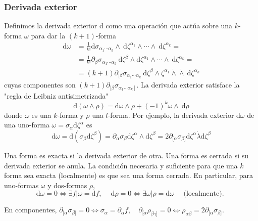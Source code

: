 \subsubsection{Derivada exterior}

Definimos la derivada exterior d como una operación que actúa sobre una $k$-forma $\omega$ para dar la $(k+1)$-forma
$$
\begin{aligned}
\mathrm{d} \omega & =\frac{1}{k!} \mathrm{d} \sigma_{\alpha_{1} \cdots \alpha_{k}} \wedge \mathrm{~d} \zeta^{\alpha_{1}} \wedge \cdots \wedge \mathrm{~d} \zeta^{\alpha_{k}}= \\
& =\frac{1}{k!} \partial_{\beta} \sigma_{\alpha_{1} \cdots \alpha_{k}} \mathrm{~d} \zeta^{\beta} \wedge \mathrm{d} \zeta^{\alpha_{1}} \wedge \cdots \wedge \mathrm{~d} \zeta^{\alpha_{k}}= \\
& =(k+1) \partial_{[\beta} \sigma_{\alpha_{1} \cdots \alpha_{k}} \mathrm{~d} \zeta^{\beta} \dot{\wedge} \zeta^{\alpha_{1}} \dot{\wedge} \dot{\wedge} \mathrm{~d} \zeta^{\alpha_{k}}
\end{aligned}
$$
cuyas componentes son $(k+1) \partial_{[\beta} \sigma_{\left.\alpha_{1} \cdots \alpha_{k}\right]}$. La derivada exterior satisface la "regla de Leibniz antisimetrizada"
$$
\mathrm{d}(\omega \wedge \rho)=\mathrm{d} \omega \wedge \rho+(-1)^{k} \omega \wedge \mathrm{~d} \rho
$$
donde $\omega$ es una $k$-forma y $\rho$ una $l$-forma.
Por ejemplo, la derivada exterior $\mathrm{d} \omega$ de una uno-forma $\omega=\sigma_{\alpha} \mathrm{d} \zeta^{\alpha}$ es 
$$
\mathrm{d} \omega=\mathrm{d}\left(\sigma_{\beta} \mathrm{d} \zeta^{\beta}\right)=\partial_{\alpha} \sigma_{\beta} \mathrm{d} \zeta^{\alpha} \wedge \mathrm{d} \zeta^{\beta}=2 \partial_{[\alpha} \sigma_{\beta]} \mathrm{d} \zeta^{\alpha} \dot{\lambda} \mathrm{d} \zeta^{\beta}
$$

Una forma es exacta si la derivada exterior de otra. Una forma es cerrada si su derivada exterior se anula. La condición necesaria y suficiente para que una $k$ forma sea exacta (localmente) es que sea una forma cerrada. En particular, para uno-formas $\omega$ y dos-formas $\rho$,
$$
\mathrm{d} \omega=0 \Leftrightarrow \exists f|\omega=\mathrm{d} f, \quad \mathrm{~d} \rho=0 \Leftrightarrow \exists \omega| \rho=\mathrm{d} \omega \quad \text { (localmente). }
$$

En componentes, $\partial_{[\alpha} \sigma_{\beta]}=0 \Leftrightarrow \sigma_{\alpha}=\partial_{\alpha} f, \quad \partial_{[\alpha} \rho_{\beta \gamma]}=0 \Leftrightarrow \rho_{\alpha \beta}=2 \partial_{[\alpha} \sigma_{\beta]}$.
